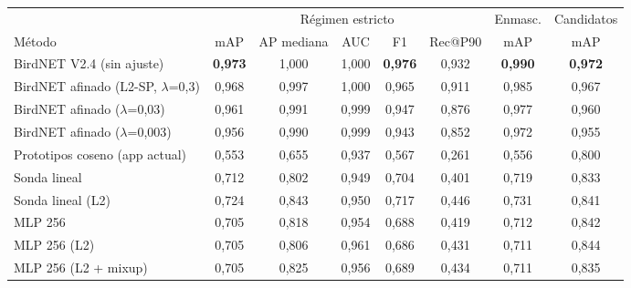 \begin{tabular}{lccccccc}
\toprule
 & \multicolumn{5}{c}{Régimen estricto} & Enmasc. & Candidatos\\
\cmidrule(lr){2-6}\cmidrule(lr){7-7}\cmidrule(lr){8-8}
Método & mAP & AP mediana & AUC & F1 & Rec@P90 & mAP & mAP\\
\midrule
BirdNET V2.4 (sin ajuste) & \textbf{0{,}973} & 1{,}000 & 1{,}000 & \textbf{0{,}976} & 0{,}932 & \textbf{0{,}990} & \textbf{0{,}972}\\
\midrule
BirdNET afinado (L2-SP, $\lambda$=0,3) & 0{,}968 & 0{,}997 & 1{,}000 & 0{,}965 & 0{,}911 & 0{,}985 & 0{,}967\\
BirdNET afinado ($\lambda$=0,03) & 0{,}961 & 0{,}991 & 0{,}999 & 0{,}947 & 0{,}876 & 0{,}977 & 0{,}960\\
BirdNET afinado ($\lambda$=0,003) & 0{,}956 & 0{,}990 & 0{,}999 & 0{,}943 & 0{,}852 & 0{,}972 & 0{,}955\\
\midrule
Prototipos coseno (app actual) & 0{,}553 & 0{,}655 & 0{,}937 & 0{,}567 & 0{,}261 & 0{,}556 & 0{,}800\\
Sonda lineal & 0{,}712 & 0{,}802 & 0{,}949 & 0{,}704 & 0{,}401 & 0{,}719 & 0{,}833\\
Sonda lineal (L2) & 0{,}724 & 0{,}843 & 0{,}950 & 0{,}717 & 0{,}446 & 0{,}731 & 0{,}841\\
MLP 256 & 0{,}705 & 0{,}818 & 0{,}954 & 0{,}688 & 0{,}419 & 0{,}712 & 0{,}842\\
MLP 256 (L2) & 0{,}705 & 0{,}806 & 0{,}961 & 0{,}686 & 0{,}431 & 0{,}711 & 0{,}844\\
MLP 256 (L2 + mixup) & 0{,}705 & 0{,}825 & 0{,}956 & 0{,}689 & 0{,}434 & 0{,}711 & 0{,}835\\
\bottomrule
\end{tabular}
